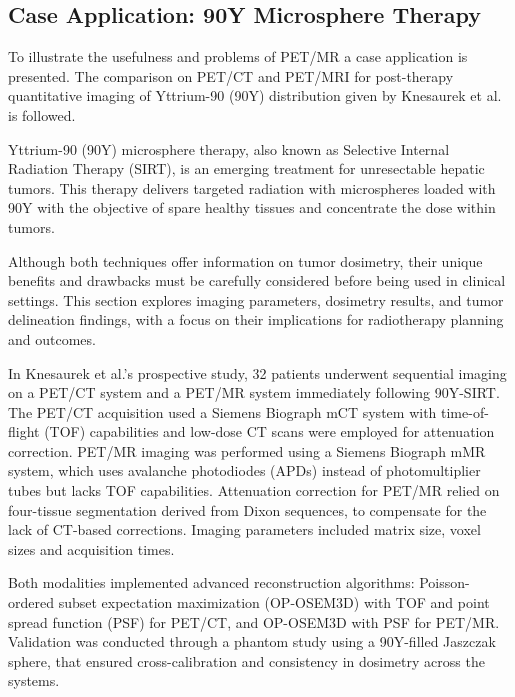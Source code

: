 \documentclass[11pt]{article} %
\begin{document}
\begin{multicols}{2}

\section{Case Application: 90Y Microsphere Therapy}

To illustrate the usefulness and problems of PET/MR a case application is presented. The comparison on PET/CT and PET/MRI for post-therapy quantitative imaging of Yttrium-90 (90Y) distribution given by Knesaurek et al. \cite{knesaurek2018} is followed.

Yttrium-90 (90Y) microsphere therapy, also known as Selective Internal Radiation Therapy (SIRT), is an emerging treatment for unresectable hepatic tumors. This therapy delivers targeted radiation with microspheres loaded with 90Y with the objective of spare healthy tissues and concentrate the dose within tumors.

Although both techniques offer information on tumor dosimetry, their unique benefits and drawbacks must be carefully considered before being used in clinical settings. This section explores imaging parameters, dosimetry results, and tumor delineation findings, with a focus on their implications for radiotherapy planning and outcomes.

In Knesaurek et al.’s prospective study, 32 patients underwent sequential imaging on a PET/CT system and a PET/MR system immediately following 90Y-SIRT. The PET/CT acquisition used a Siemens Biograph mCT system with time-of-flight (TOF) capabilities and low-dose CT scans were employed for attenuation correction. PET/MR imaging was performed using a Siemens Biograph mMR system, which uses avalanche photodiodes (APDs) instead of photomultiplier tubes but lacks TOF capabilities. Attenuation correction for PET/MR relied on four-tissue segmentation derived from Dixon sequences, to compensate for the lack of CT-based corrections. Imaging parameters included matrix size, voxel sizes and acquisition times. %

Both modalities implemented advanced reconstruction algorithms: Poisson-ordered subset expectation maximization (OP-OSEM3D) with TOF and point spread function (PSF) for PET/CT, and OP-OSEM3D with PSF for PET/MR. Validation was conducted through a phantom study using a 90Y-filled Jaszczak sphere, that ensured cross-calibration and consistency in dosimetry across the systems.


\end{multicols}
\end{document}
